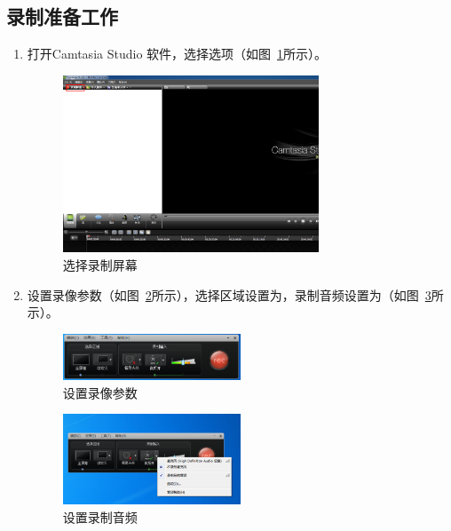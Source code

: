 \documentclass[12pt]{article}
\begin{document}
\subsection{录制准备工作}
\begin{enumerate}
\item 打开Camtasia Studio 软件，选择{\color{blue}{录制屏幕}}选项（如图~\ref{fig:fig1}所示）。
    \begin{figure}[!ht]
    \centering
    \includegraphics[width=3in]{fig1.png}
    \caption{选择录制屏幕}
    \label{fig:fig1}
    \end{figure}  
    
\item 设置录像参数（如图~\ref{fig:fig2}所示），选择区域设置为{\color{blue}{全屏幕}}，录制音频设置为（如图~\ref{fig:fig3}所示）。
    \begin{figure}[!ht]
    \centering
    \includegraphics[width=0.5\textwidth]{fig2.png}
    \caption{设置录像参数}
    \label{fig:fig2}
    \end{figure}  
    \begin{figure}[!ht]
    \centering
    \includegraphics[width=0.5\textwidth]{fig3.png}
    \caption{设置录制音频}
    \label{fig:fig3}
    \end{figure}
\end{enumerate}
\end{document}

